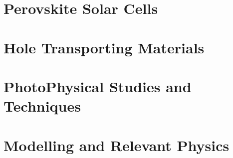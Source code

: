 \section{Perovskite Solar Cells}

\section{Hole Transporting Materials}

\section{PhotoPhysical Studies and Techniques}

\section{Modelling and Relevant Physics}